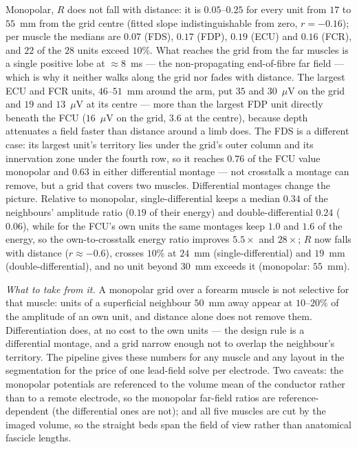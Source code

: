 \documentclass[11pt,a4paper]{article}
\begin{document}
Monopolar, $R$ does not fall with distance: it is $0.05$--$0.25$ for every unit from
$17$ to $55$~mm from the grid centre (fitted slope indistinguishable from zero,
$r = -0.16$); per muscle the medians are $0.07$ (FDS), $0.17$ (FDP), $0.19$ (ECU) and
$0.16$ (FCR), and $22$ of the $28$ units exceed $10\%$. What reaches the grid from the far
muscles is a single positive lobe at $\approx8$~ms --- the non-propagating end-of-fibre
far field --- which is why it neither walks along the grid nor fades with distance. The
largest ECU and FCR units, $46$--$51$~mm around the arm, put $35$ and
$30$~$\mu$V on the grid and $19$ and $13$~$\mu$V at its centre --- more than the largest
FDP unit directly beneath the FCU ($16$~$\mu$V on the grid, $3.6$ at the centre), because
depth attenuates a field faster than distance around a limb does. The FDS is a different
case: its largest unit's territory lies under the grid's outer column and its innervation
zone under the fourth row, so it reaches $0.76$ of the FCU value monopolar and $0.63$ in
either differential montage --- not crosstalk a montage can remove, but a grid that covers
two muscles. Differential montages
change the picture. Relative to monopolar, single-differential keeps a median $0.34$ of
the neighbours' amplitude ratio ($0.19$ of their energy) and double-differential $0.24$
($0.06$), while for the FCU's own units the same montages keep $1.0$ and $1.6$ of the
energy, so the own-to-crosstalk energy ratio improves $5.5\times$ and $28\times$; $R$ now
falls with distance ($r \approx -0.6$), crosses $10\%$ at $24$~mm
(single-differential) and $19$~mm (double-differential), and no unit beyond $30$~mm
exceeds it (monopolar: $55$~mm).

\emph{What to take from it.} A monopolar grid over a forearm muscle is not selective for
that muscle: units of a superficial neighbour $50$~mm away appear at $10$--$20\%$ of the
amplitude of an own unit, and distance alone does not remove them. Differentiation does,
at no cost to the own units --- the design rule is a differential montage, and a grid
narrow enough not to overlap the neighbour's territory. The pipeline gives these numbers
for any muscle and any layout in the segmentation for the price of one lead-field solve
per electrode. Two caveats: the monopolar potentials are referenced to the volume mean of
the conductor rather than to a remote electrode, so the monopolar far-field ratios are
reference-dependent (the differential ones are not); and all five muscles are cut by the
imaged volume, so the straight beds span the field of view rather than anatomical
fascicle lengths.
\end{document}
